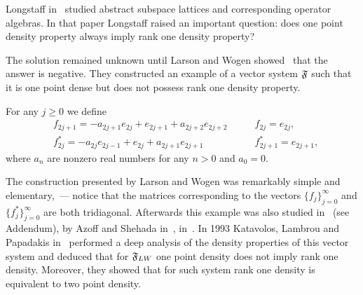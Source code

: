 \documentclass[12pt]{amsart}
\theoremstyle{case}
\begin{document}

    Long\-staff in~\cite{longstaff} studied abstract subspace lattices and corresponding operator algebras.
    In that paper Longstaff raised an important question: does one point density property always imply rank one density property?

    The solution remained unknown until Larson and Wogen showed~\cite{larson} that the answer is negative.
    They constructed an example of a vector system $\mathfrak{F}$ such that it is one point dense but does not possess rank one density property.
    \begin{example}
      \label{lw-sys}
      For any $j \geq 0$ we define
      \begin{align*}
        &f_{2j+1}=-a_{2j+1}e_{2j} + e_{2j+1} + a_{2j+2}e_{2j+2} \qquad &f_{2j}=e_{2j},\\
        &f^*_{2j}=-a_{2j}e_{2j-1} + e_{2j} + a_{2j+1}e_{2j+1} \qquad &f^*_{2j+1}=e_{2j+1},
      \end{align*}
      where $a_n$ are nonzero real numbers for any $n > 0$ and $a_0 = 0$.
    \end{example}
    The construction presented by Larson and Wogen was remarkably simple and elementary,~--- notice that the matrices corresponding to
      the vectors $\{f_j\}_{j=0}^\infty$ and $\{f^*_j\}_{j=0}^\infty$ are both tridiagonal.
    Afterwards this example was also studied in~\cite{argyroslambrou} (see Addendum), by Azoff and Shehada in~\cite{azoff}, in~\cite{me1}.
    In 1993 Katavolos, Lambrou and Papadakis in~\cite{katavolos} performed a deep analysis of the density properties
      of this vector system and deduced that for $\mathfrak{F}_{LW}$ one point density does not imply rank one density.
    Moreover, they showed that for such system rank one density is equivalent to two point density.
\end{document}

